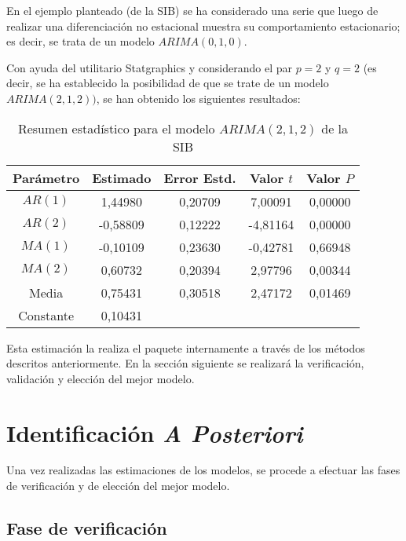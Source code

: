 \begin{ejemplo}
En el ejemplo planteado (de la SIB) se ha considerado una serie que luego de realizar una diferenciaci\'{o}n no estacional muestra su comportamiento estacionario; es decir, se trata de un modelo $ARIMA(0,1,0)$.\newline

Con ayuda del utilitario Statgraphics y considerando el par $p=2$ y  $q=2$ (es decir, se ha establecido la posibilidad de que se trate de un modelo $ARIMA(2,1,2))$, se han obtenido los siguientes resultados:

\begin{table}[H]
\centering
\begin{tabular}{@{}ccccc@{}}
\toprule
Par\'{a}metro& Estimado& Error Estd.& Valor $t$& Valor $P$ \\
\midrule
$AR(1)$& 1,44980& 0,20709& 7,00091& 0,00000 \\
$AR(2)$& -0,58809& 0,12222& -4,81164& 0,00000 \\
$MA(1)$& -0,10109& 0,23630& -0,42781& 0,66948 \\
$MA(2)$& 0,60732& 0,20394& 2,97796& 0,00344 \\
Media& 0,75431& 0,30518& 2,47172& 0,01469 \\
Constante& 0,10431& & &  \\
\bottomrule
\end{tabular}
\caption{Resumen estad\'{i}stico para el modelo $ARIMA(2,1,2)$ de la SIB}
\end{table}

\end{ejemplo}


Esta estimaci\'{o}n la realiza el paquete internamente a trav\'{e}s de los m\'{e}todos descritos anteriormente. En la secci\'{o}n siguiente se realizar\'{a} la verificaci\'{o}n, validaci\'{o}n y elecci\'{o}n del mejor modelo.

\section{Identificaci\'{o}n \emph{A Posteriori}}

Una vez realizadas las estimaciones de los modelos, se procede a efectuar las fases de verificaci\'{o}n y de elecci\'{o}n del mejor modelo.

\subsection{Fase de verificaci\'{o}n}


